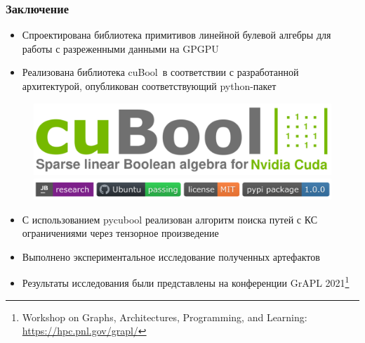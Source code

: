 \documentclass[aspectratio=169,xcolor=table,english]{beamer}
\begin{document}
\begin{frame}[fragile] \frametitle{Заключение}
    \begin{minipage}[m]{0.65\linewidth}
        \begin{itemize}
            \item Спроектирована библиотека примитивов линейной булевой алгебры для работы с разреженными данными на GPGPU
            \item Реализована библиотека cuBool\footnotemark~в соответствии с разработанной архитектурой, опубликован соответствующий python-пакет\footnotemark 
        \end{itemize}    
    \end{minipage}\hfill 
    \begin{minipage}[m]{0.35\linewidth}
        \begin{figure}
            \centering
            \includegraphics[width=1.0\textwidth]{figures/cubool_logo.png}
            \includegraphics[width=1.0\textwidth]{figures/cubool_status.png}
        \end{figure}
    \end{minipage}\hfill 


    \begin{itemize}
        \item С использованием pycubool реализован алгоритм поиска путей с КС ограничениями через тензорное произведение
        \item Выполнено экспериментальное исследование полученных артефактов
        \break
        \item  Результаты исследования были представлены на конференции GrAPL 2021\footnote{Workshop on Graphs, Architectures, Programming, and Learning: \url{https://hpc.pnl.gov/grapl/}}
    \end{itemize}
\end{frame}
\end{document}
